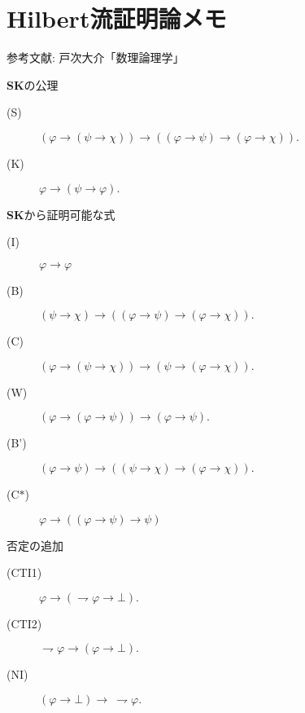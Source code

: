\section{Hilbert流証明論メモ}
	参考文献: 戸次大介「数理論理学」
	
	\begin{itembox}[l]{{\bf SK}の公理}
		\begin{description}
			\item[(S)] $(\varphi \rightarrow (\psi \rightarrow \chi)) 
				\rightarrow ((\varphi \rightarrow \psi)
				\rightarrow (\varphi \rightarrow \chi)).$
			
			\item[(K)] $\varphi \rightarrow (\psi \rightarrow \varphi).$
		\end{description}
	\end{itembox}
	
	{\bf SK}から証明可能な式
	\begin{description}
		\item[(I)] $\varphi \rightarrow \varphi$
		\item[(B)] $(\psi \rightarrow \chi) \rightarrow ((\varphi \rightarrow \psi) \rightarrow (\varphi \rightarrow \chi)).$
		\item[(C)] $(\varphi \rightarrow (\psi \rightarrow \chi)) \rightarrow (\psi \rightarrow (\varphi \rightarrow \chi)).$
		\item[(W)] $(\varphi \rightarrow (\varphi \rightarrow \psi)) \rightarrow (\varphi \rightarrow \psi).$
		\item[(B')] $(\varphi \rightarrow \psi) \rightarrow ((\psi \rightarrow \chi) \rightarrow (\varphi \rightarrow \chi)).$
		\item[(C$\ast$)] $\varphi \rightarrow ((\varphi \rightarrow \psi) \rightarrow \psi)$
	\end{description}
	
	\begin{itembox}[l]{否定の追加}
		\begin{description}
			\item[(CTI1)] $\varphi \rightarrow (\rightharpoondown \varphi \rightarrow \bot).$
			
			\item[(CTI2)] $\rightharpoondown \varphi \rightarrow (\varphi \rightarrow \bot).$
			
			\item[(NI)] $(\varphi \rightarrow \bot) \rightarrow\ \rightharpoondown \varphi.$
		\end{description}
	\end{itembox}
	
